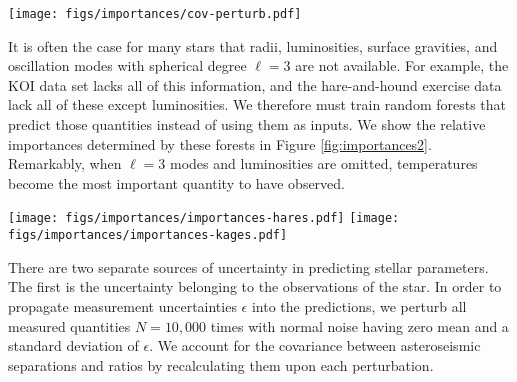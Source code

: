\documentclass[manuscript]{aastex}
\begin{document}
\begin{figure*}
    \centering
    \texttt{[image: figs/importances/cov-perturb.pdf]}
    \caption{Standardized covariances of random forest feature importances, with the variables shown in order of median importance. Blue points on the off-diagonal indicate that when the abscissa variable is selected, the ordinate variable is redundant; and conversely, red points indicate that when the abscissa variable is selected, the ordinate variable becomes more useful for successful forecasting.}
    \label{fig:importance-covariances}
\end{figure*}

It is often the case for many stars that radii, luminosities, surface gravities, and oscillation modes with spherical degree $\ell=3$ are not available. For example, the KOI data set lacks all of this information, and the hare-and-hound exercise data lack all of these except luminosities. We therefore must train random forests that predict those quantities instead of using them as inputs. We show the relative importances determined by these forests in Figure \ref{fig:importances2}. Remarkably, when $\ell=3$ modes and luminosities are omitted, temperatures become the most important quantity to have observed.

\begin{figure*}
    \centering
    \texttt{[image: figs/importances/importances-hares.pdf]}\hfill
    \texttt{[image: figs/importances/importances-kages.pdf]}
    \caption{Box-and-whisker plots of relative importances of each observable feature in measuring fundamental stellar parameters for the hare-and-hound exercise data (left), where luminosities are available; and the Kepler objects-of-interest (right), where they are not. Octupole ($\ell=3$) modes have not been measured in any of these stars, so $\langle\delta\nu_{1,3}\rangle$ and $\langle r_{1,3}\rangle$ from evolutionary modelling are not supplied to these random forests. }
    \label{fig:importances2}
\end{figure*}

There are two separate sources of uncertainty in predicting stellar parameters. The first is the uncertainty belonging to the observations of the star. In order to propagate measurement uncertainties $\epsilon$ into the predictions, we perturb all measured quantities $N=10,000$ times with normal noise having zero mean and a standard deviation of $\epsilon$. We account for the covariance between asteroseismic separations and ratios by recalculating them upon each perturbation. 
\end{document}

